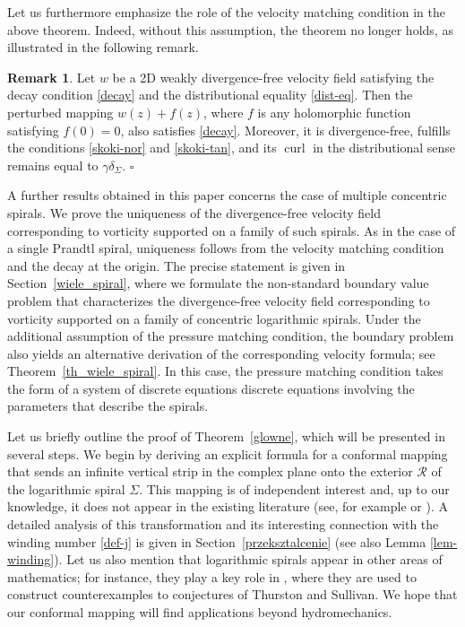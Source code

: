 \documentclass[11pt, letterpaper, reqno]{amsart}
\numberwithin{equation}{section}
\theoremstyle{definition}
\newtheorem{rem}[defi]{Remark}
\theoremstyle{plain}
\numberwithin{equation}{section}
\def\RR{\mathcal{R}}
\DeclareMathOperator{\curl}{curl}
\begin{document}
Let us furthermore emphasize the role of the velocity matching condition in the above theorem. Indeed, without this assumption, the theorem no longer holds, as illustrated in the following remark.
\begin{rem}\label{poglowne}
Let $w$ be a 2D weakly divergence-free velocity field satisfying the decay condition \eqref{decay} and the distributional equality \eqref{dist-eq}. Then the perturbed mapping $w(z)+f(z)$, where $f$ is any holomorphic function satisfying $f(0)=0$, also satisfies \eqref{decay}. Moreover, it is divergence-free, fulfills the conditions \eqref{skoki-nor} and \eqref{skoki-tan}, and its $\curl$ in the distributional sense remains equal to $\gamma\delta_{\Sigma}$. \hfill $\square$
\end{rem}
A further results obtained in this paper concerns the case of multiple concentric spirals. We prove the uniqueness of the divergence-free velocity field corresponding to vorticity supported on a family of such spirals. As in the case of a single Prandtl spiral, uniqueness follows from the velocity matching condition and the decay at the origin. The precise statement is given in Section~\ref{wiele_spiral}, where we formulate the non-standard boundary value problem that characterizes the divergence-free velocity field corresponding to vorticity supported on a family of concentric logarithmic spirals. Under the additional assumption of the pressure matching condition, the boundary problem also yields an alternative derivation of the corresponding velocity formula; see Theorem~\ref{th_wiele_spiral}. In this case, the pressure matching condition takes the form of a system of discrete equations discrete equations involving the parameters that describe the spirals.


Let us briefly outline the proof of Theorem~\ref{glowne}, which will be presented in several steps. We begin by deriving an explicit formula for a conformal mapping that sends an infinite vertical strip in the complex plane onto the exterior $\RR$ of the logarithmic spiral $\Sigma$. This mapping is of independent interest and, up to our knowledge, it does not appear in the existing literature (see, for example \cite{Ahlfors} or \cite{Rudin}). A detailed analysis of this transformation and its interesting connection with the winding number \eqref{def-j} is given in Section~\ref{przeksztalcenie} (see also Lemma \ref{lem-winding}). Let us also mention that logarithmic spirals appear in other areas of mathematics; for instance, they play a key role in \cite{Markovic}, where they are used to construct counterexamples to conjectures of Thurston and Sullivan. We hope that our conformal mapping will find applications beyond hydromechanics. 
\end{document}
